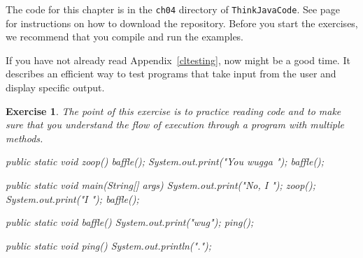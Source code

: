 \documentclass[12pt]{book}
\theoremstyle{exercise}
\newtheorem{exercise}{Exercise}[chapter]
\newcommand{\java}{\verb}%}
\begin{document}
The code for this chapter is in the {\tt ch04} directory of {\tt ThinkJavaCode}.
See page~\pageref{code} for instructions on how to download the repository.
Before you start the exercises, we recommend that you compile and run the examples.

If you have not already read Appendix~\ref{cltesting}, now might be a good time.
It describes an efficient way to test programs that take input from the user and display specific output.


\begin{exercise}

The point of this exercise is to practice reading code and to make sure that you understand the flow of execution through a program with multiple methods.


\begin{code}
public static void zoop() {
    baffle();
    System.out.print("You wugga ");
    baffle();
}

public static void main(String[] args) {
    System.out.print("No, I ");
    zoop();
    System.out.print("I ");
    baffle();
}

public static void baffle() {
    System.out.print("wug");
    ping();
}

public static void ping() {
    System.out.println(".");
}
\end{code}

\end{exercise}



\end{document}
